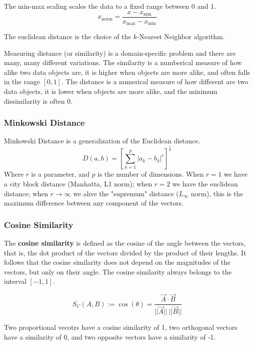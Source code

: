 The min-max scaling scales the data to a fixed range between 0 and 1.
\begin{equation*}
    x_\text{norm} = \frac {x-x_\text{min}} {x_\text{max} - x_\text{min}}
\end{equation*}

The euclidean distance is the choice of the \(k\)-Nearest Neighbor algorithm.

Measuring distance (or similarity) is a domain-specific problem and there are many, many different variations. The similarity is a numberical measure of how alike two data objects are, it is higher when objects are more alike, and often falls in the range \([0,1]\). The distance is a numerical measure of how different are two data objects, it is lower when objects are more alike, and the minimum dissimilarity is often 0.

\subsubsection{Minkowski Distance}
Minkowski Distance is a generalization of the Euclidean distance.
\begin{equation}
    D(a,b) = \left[ \sum_{k=1}^p |a_k - b_k|^r \right]^{\frac 1 r}
\end{equation}
Where \(r\) is a parameter, and \(p\) is the number of dimensions. When \(r=1\) we have a city block distance (Manhatta, L1 norm); when \(r=2\) we have the euclidean distance; when \(r \to \infty\) we ahve the "supremum" distance (\(L_\infty\) norm), this is the maximum difference between any component of the vectors.

\subsubsection{Cosine Similarity}
The \textbf{cosine similarity} is defined as the cosine of the angle between the vectors, that is, the dot product of the vectors divided by the product of their lengths. It follows that the cosine similarity does not depend on the magnitudes of the vectors, but only on their angle. The cosine similarity always belongs to the interval \([-1,1]\).

\begin{equation}
S_C(A,B) := \cos(\theta) = \frac {\vec{A} \cdot \vec{B}} {||\vec{A}||\ ||\vec{B}||}
\end{equation}

Two proportional vecotrs have a cosine similarity of 1, two orthogonal vectors have a similarity of 0, and two opposite vectors have a similarity of -1.

